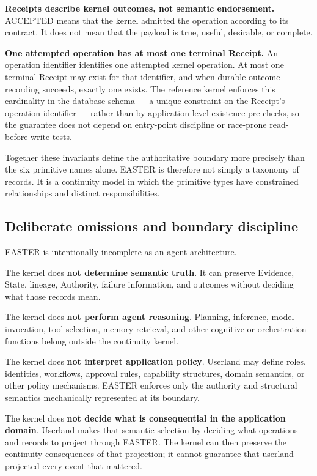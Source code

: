 \documentclass[11pt]{article}
\begin{document}
\textbf{Receipts describe kernel outcomes, not semantic endorsement.} ACCEPTED means that the kernel admitted the operation according to its contract. It does not mean that the payload is true, useful, desirable, or complete.

\textbf{One attempted operation has at most one terminal Receipt.} An operation identifier identifies one attempted kernel operation. At most one terminal Receipt may exist for that identifier, and when durable outcome recording succeeds, exactly one exists. The reference kernel enforces this cardinality in the database schema --- a unique constraint on the Receipt's operation identifier --- rather than by application-level existence pre-checks, so the guarantee does not depend on entry-point discipline or race-prone read-before-write tests.

Together these invariants define the authoritative boundary more precisely than the six primitive names alone. EASTER is therefore not simply a taxonomy of records. It is a continuity model in which the primitive types have constrained relationships and distinct responsibilities.

\subsection{Deliberate omissions and boundary discipline}

EASTER is intentionally incomplete as an agent architecture.

The kernel does \textbf{not determine semantic truth}. It can preserve Evidence, State, lineage, Authority, failure information, and outcomes without deciding what those records mean.

The kernel does \textbf{not perform agent reasoning}. Planning, inference, model invocation, tool selection, memory retrieval, and other cognitive or orchestration functions belong outside the continuity kernel.

The kernel does \textbf{not interpret application policy}. Userland may define roles, identities, workflows, approval rules, capability structures, domain semantics, or other policy mechanisms. EASTER enforces only the authority and structural semantics mechanically represented at its boundary.

The kernel does \textbf{not decide what is consequential in the application domain}. Userland makes that semantic selection by deciding what operations and records to project through EASTER. The kernel can then preserve the continuity consequences of that projection; it cannot guarantee that userland projected every event that mattered.
\end{document}
